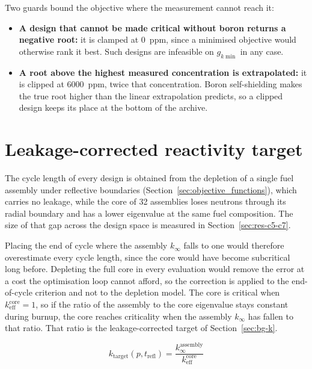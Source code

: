 Two guards bound the objective where the measurement cannot reach it:

\begin{itemize}
  \item \textbf{A design that cannot be made critical without boron
        returns a negative root:} it is clamped at \SI{0}{ppm}, since a
        minimised objective would otherwise rank it best. Such designs
        are infeasible on $g_{k\min}$ in any case.

  \item \textbf{A root above the highest measured concentration is
        extrapolated:} it is clipped at \SI{6000}{ppm}, twice that
        concentration. Boron self-shielding makes the true root higher
        than the linear extrapolation predicts, so a clipped design
        keeps its place at the bottom of the archive.
\end{itemize}

\section{Leakage-corrected reactivity target}
\label{sec:meth-ktarget}

The cycle length of every design is obtained from the depletion of a
single fuel assembly under reflective boundaries
(Section~\ref{sec:objective_functions}), which carries no leakage,
while the core of 32 assemblies loses neutrons through its radial
boundary and has a lower eigenvalue at the same fuel composition. The
size of that gap across the design space is measured in
Section~\ref{sec:res-c5-c7}.

Placing the end of cycle where the assembly $k_\infty$ falls to one
would therefore overestimate every cycle length, since the core would
have become subcritical long before. Depleting the full core in every
evaluation would remove the error at a cost the optimisation loop
cannot afford, so the correction is applied to the end-of-cycle
criterion and not to the depletion model. The core is critical when
$k_\mathrm{eff}^\mathrm{core} = 1$, so if the ratio of the assembly to
the core eigenvalue stays constant during burnup, the core reaches
criticality when the assembly $k_\infty$ has fallen to that ratio. That
ratio is the leakage-corrected target of Section~\ref{sec:bg-k}.

\begin{equation}
k_\mathrm{target}(p, t_\mathrm{refl})
= \frac{k_\infty^\mathrm{assembly}}{k_\mathrm{eff}^\mathrm{core}}
\label{eq:ktarget}
\end{equation}

